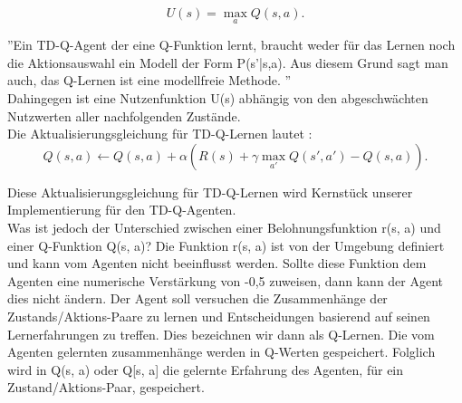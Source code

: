 \begin{equation}
\label{eq:Nutzenwerte und Q-Werte}
U(s) = \max_a Q(s,a).
\end{equation}

''Ein TD-Q-Agent der eine Q-Funktion lernt, braucht weder für das Lernen noch die Aktionsauswahl ein Modell der Form P(s'|s,a). Aus diesem Grund sagt man auch, das Q-Lernen ist eine modellfreie Methode. \cite[974]{Russell}'' \\

Dahingegen ist eine Nutzenfunktion U(s) abhängig von den abgeschwächten Nutzwerten aller nachfolgenden Zustände. \\

Die Aktualisierungsgleichung für TD-Q-Lernen lautet \cite[974]{Russell}: \\

\begin{equation}
Q(s,a) \leftarrow Q(s,a) + \alpha(R(s) + \gamma \max_{a'} Q(s',a') - Q(s,a)).
\end{equation}

Diese Aktualisierungsgleichung für TD-Q-Lernen wird Kernstück unserer Implementierung für den TD-Q-Agenten. \\

Was ist jedoch der Unterschied zwischen einer Belohnungsfunktion r(s, a) und einer Q-Funktion Q(s, a)? Die Funktion r(s, a) ist von der Umgebung definiert und kann vom Agenten nicht beeinflusst werden. Sollte diese Funktion dem Agenten eine numerische Verstärkung von -0,5 zuweisen, dann kann der Agent dies nicht ändern. Der Agent soll versuchen die Zusammenhänge der Zustands/Aktions-Paare zu lernen und Entscheidungen basierend auf seinen Lernerfahrungen zu treffen. Dies bezeichnen wir dann als Q-Lernen. Die vom Agenten gelernten zusammenhänge werden in Q-Werten gespeichert. Folglich wird in Q(s, a) oder Q[s, a] die gelernte Erfahrung des Agenten, für ein Zustand/Aktions-Paar, gespeichert. \\
